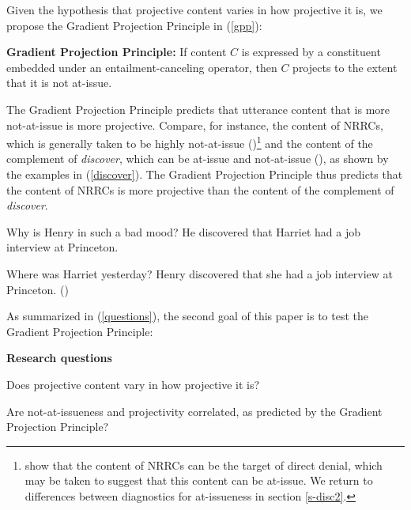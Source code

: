 \documentclass[11pt,fleqn]{article}
\newcommand{\6}{\mbox{$[\hspace*{-.6mm}[$}}
\newcommand{\9}{\mbox{$]\hspace*{-.6mm}]$}}
\begin{document}
Given the hypothesis that projective content varies in how projective it is, we propose the Gradient Projection Principle in (\ref{gpp}):

\begin{exe}
\ex\label{gpp} {\bf Gradient Projection Principle:} If content $C$ is expressed by a constituent embedded under an entailment-canceling operator, then $C$ projects to the 
extent that it is not at-issue.

\end{exe} 
The Gradient Projection Principle predicts that utterance content that is more not-at-issue is more projective. Compare, for instance, the content of NRRCs, which is generally taken to be highly not-at-issue (\citealt{potts05})\footnote{\citet{syrett-koev2015} show that the content of NRRCs can be the target of direct denial, which may be taken to suggest that this content can be at-issue. We return to differences between diagnostics for at-issueness in section \ref{s-disc2}.} and the content of the complement of {\em discover}, which can be at-issue and not-at-issue (\citealt{simons07}), as shown by the examples in (\ref{discover}). The Gradient Projection Principle thus predicts that the content of NRRCs is more projective than the content of the complement of {\em discover}.

\begin{exe}
\ex\label{discover}
\begin{xlist}

\ex
\begin{xlist}
 Why is Henry in such a bad mood?
 He discovered that Harriet had a job interview at Princeton. 
\end{xlist}

\ex
\begin{xlist}
 Where was Harriet yesterday?
 Henry discovered that she had a job interview at Princeton. \hfill (\citealt[1035]{simons07})
\end{xlist}
\end{xlist}
\end{exe}
As summarized in (\ref{questions}), the second goal of this paper is to test the Gradient Projection Principle:

\begin{exe}
\ex\label{questions} {\bf Research questions}

\begin{xlist} 

\ex Does projective content vary in how projective it is?

\ex Are not-at-issueness and projectivity correlated, as predicted by the Gradient Projection Principle?
\end{xlist}

\end{exe} 
\end{document}
